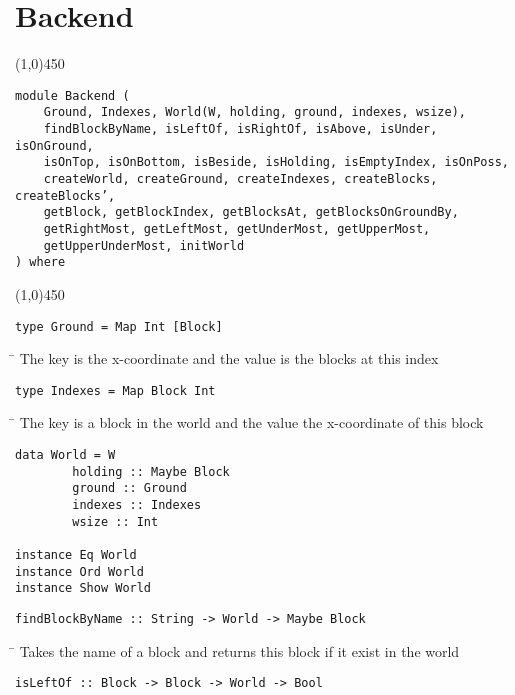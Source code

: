 \section{Backend}
\begin{center}
\line(1,0){450}
\end{center}
\begin{verbatim}
module Backend (
    Ground, Indexes, World(W, holding, ground, indexes, wsize),
    findBlockByName, isLeftOf, isRightOf, isAbove, isUnder, isOnGround,
    isOnTop, isOnBottom, isBeside, isHolding, isEmptyIndex, isOnPoss,
    createWorld, createGround, createIndexes, createBlocks, createBlocks’,
    getBlock, getBlockIndex, getBlocksAt, getBlocksOnGroundBy,
    getRightMost, getLeftMost, getUnderMost, getUpperMost,
    getUpperUnderMost, initWorld
) where
\end{verbatim}
\begin{center}
\line(1,0){450}
\end{center}
\begin{verbatim}
type Ground = Map Int [Block]
\end{verbatim}
\begin{tabbing}
\hspace*{1cm}\= \kill
\> The key is the x-coordinate and the value is the blocks at this index
\end{tabbing}
\begin{verbatim}
type Indexes = Map Block Int
\end{verbatim}
\begin{tabbing}
\hspace*{1cm}\= \kill
\> The key is a block in the world and the value the x-coordinate of this block
\end{tabbing}
\begin{verbatim}
data World = W 
        holding :: Maybe Block
        ground :: Ground
        indexes :: Indexes
        wsize :: Int

instance Eq World
instance Ord World
instance Show World
\end{verbatim}
\begin{verbatim}
findBlockByName :: String -> World -> Maybe Block
\end{verbatim}
\begin{tabbing}
\hspace*{1cm}\= \kill
\> Takes the name of a block and returns this block if it exist in the world
\end{tabbing}
\begin{verbatim}
isLeftOf :: Block -> Block -> World -> Bool
\end{verbatim}
